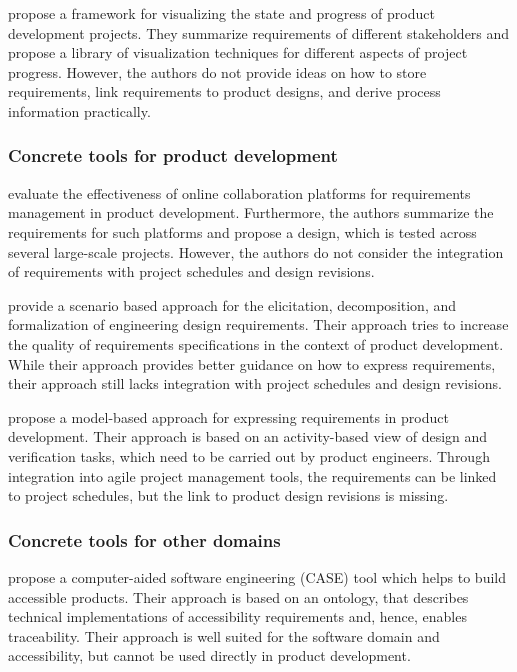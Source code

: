 \cite{RICHTER2020271} propose a framework for visualizing the state and progress of product development projects.
They summarize requirements of different stakeholders and propose a library of visualization techniques for different aspects of project progress.
However, the authors do not provide ideas on how to store requirements, link requirements to product designs, and derive process information practically.

\subsubsection{Concrete tools for product development}
\label{sec:differentiation:academic:concrete-product}

\cite{Ahti2005} evaluate the effectiveness of online collaboration platforms for requirements management in product development.
Furthermore, the authors summarize the requirements for such platforms and propose a design, which is tested across several large-scale projects.
However, the authors do not consider the integration of requirements with project schedules and design revisions.

\cite{liu2012scenario} provide a scenario based approach for the elicitation, decomposition, and formalization of engineering design requirements.
Their approach tries to increase the quality of requirements specifications in the context of product development.
While their approach provides better guidance on how to express requirements, their approach still lacks integration with project schedules and design revisions.

\cite{WINDISCH2022550} propose a model-based approach for expressing requirements in product development.
Their approach is based on an activity-based view of design and verification tasks, which need to be carried out by product engineers.
Through integration into agile project management tools, the requirements can be linked to project schedules, but the link to product design revisions is missing.

\subsubsection{Concrete tools for other domains}
\label{sec:differentiation:academic:concrete-software}

\cite{6976693} propose a computer-aided software engineering (CASE) tool which helps to build accessible products.
Their approach is based on an ontology, that describes technical implementations of accessibility requirements and, hence, enables traceability.
Their approach is well suited for the software domain and accessibility, but cannot be used directly in product development.

